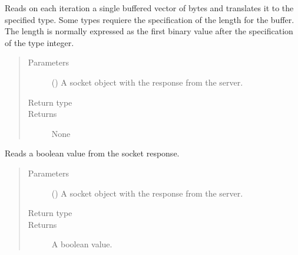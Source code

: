 \documentclass[letterpaper,10pt,english]{sphinxmanual}
\begin{document}

\begin{fulllineitems}
\label{\detokenize{index:secondodb.api.support.secondoinputhandler.read_binary_record}}
Reads on each iteration a single buffered vector of bytes and translates it to the specified type. Some types
requiere the specification of the length for the buffer. The length is normally expressed as the first binary value
after the specification of the type integer.
\begin{quote}\begin{description}
\item[{Parameters}] \leavevmode
{} () \textendash{} A socket object with the response from the  server.

\item[{Return type}] \leavevmode
{}

\item[{Returns}] \leavevmode
None

\end{description}\end{quote}

\end{fulllineitems}


\begin{fulllineitems}
\label{\detokenize{index:secondodb.api.support.secondoinputhandler.read_bool}}
Reads a boolean value from the socket response.
\begin{quote}\begin{description}
\item[{Parameters}] \leavevmode
{} () \textendash{} A socket object with the response from the  server.

\item[{Return type}] \leavevmode
{}

\item[{Returns}] \leavevmode
A boolean value.

\end{description}\end{quote}

\end{fulllineitems}
\end{document}
